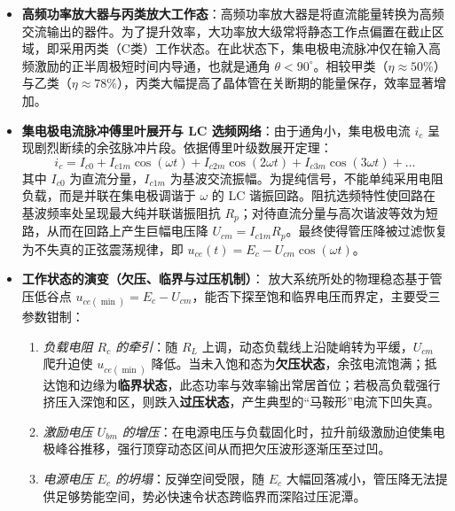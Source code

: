 \documentclass[12pt]{article}
\begin{document}
\vspace{1em}
\begin{itemize}
    \item \textbf{高频功率放大器与丙类放大工作态}：高频功率放大器是将直流能量转换为高频交流输出的器件。为了提升效率，大功率放大级常将静态工作点偏置在截止区域，即采用丙类（C类）工作状态。在此状态下，集电极电流脉冲仅在输入高频激励的正半周极短时间内导通，也就是通角 $\theta < 90^\circ$。相较甲类（$\eta \approx 50\%$）与乙类（$\eta \approx 78\%$），丙类大幅提高了晶体管在关断期的能量保存，效率显著增加。
    \item \textbf{集电极电流脉冲傅里叶展开与 LC 选频网络}：由于通角小，集电极电流 $i_c$ 呈现剧烈断续的余弦脉冲片段。依据傅里叶级数展开定理：
    \[
    i_c = I_{c0} + I_{c1m} \cos(\omega t) + I_{c2m} \cos(2\omega t) + I_{c3m} \cos(3\omega t) + \dots
    \]
    其中 $I_{c0}$ 为直流分量，$I_{c1m}$ 为基波交流振幅。为提纯信号，不能单纯采用电阻负载，而是并联在集电极调谐于 $\omega$ 的 LC 谐振回路。阻抗选频特性使回路在基波频率处呈现最大纯并联谐振阻抗 $R_p$；对待直流分量与高次谐波等效为短路，从而在回路上产生巨幅电压降 $U_{cm} = I_{c1m} R_p$。最终使得管压降被过滤恢复为不失真的正弦震荡规律，即 $u_{ce}(t) = E_c - U_{cm}\cos(\omega t)$。
    \item \textbf{工作状态的演变（欠压、临界与过压机制）}：
        放大系统所处的物理稳态基于管压低谷点 $u_{ce(\min)} = E_c - U_{cm}$，能否下探至饱和临界电压而界定，主要受三参数钳制：
        \begin{enumerate}
            \item \emph{负载电阻 $R_c$ 的牵引}：随 $R_L$ 上调，动态负载线上沿陡峭转为平缓，$U_{cm}$ 爬升迫使 $u_{ce(\min)}$ 降低。当未入饱和态为\textbf{欠压状态}，余弦电流饱满；抵达饱和边缘为\textbf{临界状态}，此态功率与效率输出常居首位；若极高负载强行挤压入深饱和区，则跌入\textbf{过压状态}，产生典型的“马鞍形”电流下凹失真。
            \item \emph{激励电压 $U_{bm}$ 的增压}：在电源电压与负载固化时，拉升前级激励迫使集电极峰谷推移，强行顶穿动态区间从而把欠压波形逐渐压至过凹。
            \item \emph{电源电压 $E_c$ 的坍塌}：反弹空间受限，随 $E_c$ 大幅回落减小，管压降无法提供足够势能空间，势必快速令状态跨临界而深陷过压泥潭。
        \end{enumerate}
\end{itemize}
\end{document}
